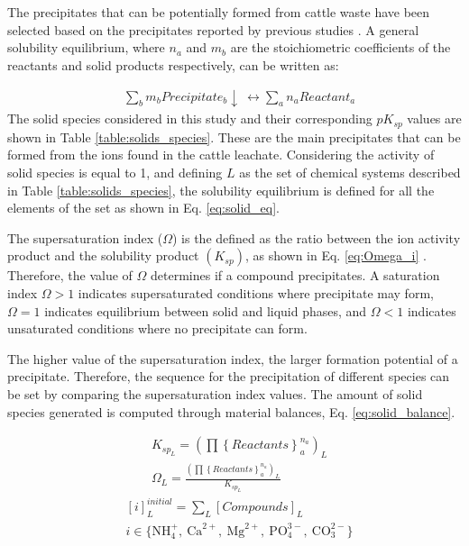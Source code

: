 \begin{refsection}[referencesCh3]
The precipitates that can be potentially formed from cattle waste have been selected based on the precipitates reported by previous studies \citep{Tao, Harada, gadekar2010validation}. A general solubility equilibrium, where $n_{a}$ and $m_{b}$ are the stoichiometric coefficients of the reactants and solid products respectively, can be written as:

\begin{align}
& \sum_{b} m_{b} Precipitate_{b}\downarrow  \ \leftrightarrow \sum_{a} n_{a} Reactant_{a}
\end{align}
The solid species considered in this study and their corresponding $pK_{sp}$ values are shown in Table \ref{table:solids_species}. These are the main precipitates that can be formed from the ions found in the cattle leachate. Considering the activity of solid species is equal to 1, and defining $L$ as the set of chemical systems described in Table \ref{table:solids_species}, the solubility equilibrium is defined for all the elements of the set as shown in Eq. \ref{eq:solid_eq}.

The supersaturation index ($\Omega$) is the defined as the ratio between the ion activity product and the solubility product $\left(K_{sp}\right)$, as shown in Eq. \ref{eq:Omega_i} \citep{Tao}. Therefore, the value of $\Omega$ determines if a compound precipitates. A saturation index $\Omega > 1$ indicates supersaturated conditions where precipitate may form, $\Omega =1 $ indicates equilibrium between solid and liquid phases, and $\Omega < 1$ indicates unsaturated conditions where no precipitate can form. 

The higher value of the supersaturation index, the larger formation potential of a precipitate. Therefore, the sequence for the precipitation of different species can be set by comparing the supersaturation index values. The amount of solid species generated is computed through material balances, Eq. \ref{eq:solid_balance}.

\begin{align} 
& K_{sp_{L}}   = \left( \prod \left\{ Reactants \right\}_{a}^{n_{a}} \right)_{L} \label{eq:solid_eq}\\
& \Omega_{L}= \frac{ \left( \prod \left\{ Reactants \right\}_{a}^{n_{a}} \right)_{L} }{ K_{sp_{L}}  } \label{eq:Omega_i}
\end{align}
\begin{align}
& \left[ i \right]_{L}^{initial} =  \sum_{L} \left[Compounds\right]_{L} \label{eq:solid_balance} \\
& i \in \bigl\{\text{NH}_{4}^{+}, \ \text{Ca}^{2+}, \ \text{Mg}^{2+}, \ \text{PO}_{4}^{3-}, \ \text{CO}_{3}^{2-} \bigr\} \nonumber 
\end{align}


\end{refsection}
